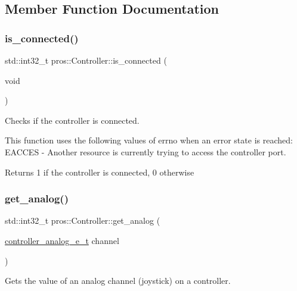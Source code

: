 \subsection{Member Function Documentation}
\mbox{\label{classpros_1_1Controller_a1a013e9cf1979487f2daabcd729d3ecb}} 
\subsubsection{\texorpdfstring{is\+\_\+connected()}{is\_connected()}}
{\footnotesize\ttfamily std\+::int32\+\_\+t pros\+::\+Controller\+::is\+\_\+connected (\begin{DoxyParamCaption}\item[{void}]{ }\end{DoxyParamCaption})}



Checks if the controller is connected. 

This function uses the following values of errno when an error state is reached\+: E\+A\+C\+C\+ES -\/ Another resource is currently trying to access the controller port.

\begin{DoxyReturn}{Returns}
1 if the controller is connected, 0 otherwise 
\end{DoxyReturn}
\mbox{\label{classpros_1_1Controller_ace3038684aa3cf14f06279c54eeb1105}} 
\subsubsection{\texorpdfstring{get\+\_\+analog()}{get\_analog()}}
{\footnotesize\ttfamily std\+::int32\+\_\+t pros\+::\+Controller\+::get\+\_\+analog (\begin{DoxyParamCaption}\item[{\hyperlink{misc_8h_a8bdd0963e2bc0d4fbe03435eee8a5ca5}{controller\+\_\+analog\+\_\+e\+\_\+t}}]{channel }\end{DoxyParamCaption})}



Gets the value of an analog channel (joystick) on a controller. 

